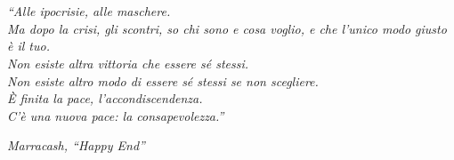 \chapter*{}
\thispagestyle{plain}

\vspace*{\fill}
\epigraph{\large \textit{``Alle ipocrisie, alle maschere.
\\Ma dopo la crisi, gli scontri, so chi sono e cosa voglio,
e che l'unico modo giusto \`e il tuo.
\\Non esiste altra vittoria che essere s\'e stessi.
\\Non esiste altro modo di essere s\'e stessi se non scegliere.
\\\`E finita la pace, l'accondiscendenza.
\\C'\`e una nuova pace: la consapevolezza.''}}{\textup{\large \textit{Marracash, ``Happy End''}}}